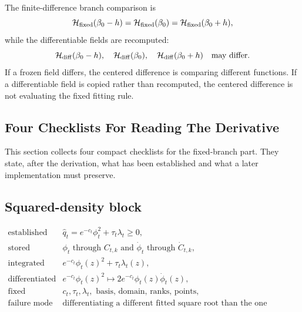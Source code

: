 \documentclass[11pt]{article}
\numberwithin{equation}{section}
\begin{document}
The finite-difference branch comparison is
\begin{equation}
    \mathcal H_{\rm fixed}(\beta_0-h)
    =
    \mathcal H_{\rm fixed}(\beta_0)
    =
    \mathcal H_{\rm fixed}(\beta_0+h),
    \label{eq:p24-p23-man6}
\end{equation}
while the differentiable fields are recomputed:
\begin{equation}
    \mathcal H_{\rm diff}(\beta_0-h),
    \quad
    \mathcal H_{\rm diff}(\beta_0),
    \quad
    \mathcal H_{\rm diff}(\beta_0+h)
    \quad
    \text{may differ.}
    \label{eq:p24-p23-man7}
\end{equation}
If a frozen field differs, the centered difference is comparing different
functions.  If a differentiable field is copied rather than recomputed, the
centered difference is not evaluating the fixed fitting rule.

\subsection{Four Checklists For Reading The Derivative}

This section collects four compact checklists for the fixed-branch part.  They
state, after the derivation, what has been established and what a later
implementation must preserve.

\subsection*{Squared-density block}

\begin{equation}
\begin{array}{ll}
\text{established} &
    \widehat q_t=e^{-c_t}\phi_t^2+\tau_t\lambda_t\ge0,\\[1mm]
\text{stored} &
    \phi_t \text{ through } C_{t,k}
    \text{ and } \dot\phi_t \text{ through } \dot C_{t,k},\\[1mm]
\text{integrated} &
    e^{-c_t}\phi_t(z)^2+\tau_t\lambda_t(z),\\[1mm]
\text{differentiated} &
    e^{-c_t}\phi_t(z)^2
    \mapsto 2e^{-c_t}\phi_t(z)\dot\phi_t(z),\\[1mm]
\text{fixed} &
    c_t,\tau_t,\lambda_t,\text{ basis, domain, ranks, points},\\[1mm]
\text{failure mode} &
    \text{differentiating a different fitted square root than the one squared.}
\end{array}
\label{eq:p24-p22-r1}
\end{equation}
\end{document}
